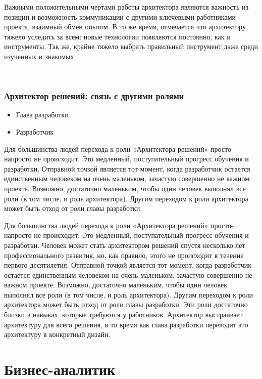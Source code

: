 \documentclass{../industrial-development}
\begin{document}
\lecturenotes

Важными положительными чертами работы архитектора являются важность из позиции и возможность коммуникации с другими ключевыми работниками проекта, взаимный обмен опытом. В то же время, отмечается что архитектору тяжело уследить за всем: новые технологии появляются постоянно, как и инструменты. Так же, крайне тяжело выбрать правильный инструмент даже среди изученных и знакомых. 

  ~\cite{Anatomy}

\begin{frame} \frametitle{Архитектор решений: связь с другими ролями}
  \begin{itemize}
  \item Глава разработки
  \item Разработчик
  \end{itemize}
	\begin{block}{}
	\alert {}Для большинства людей перехода к роли «Архитектора решений» просто-напросто не происходит. Это медленный, поступательный прогресс обучения и разработки.
	Отправной точкой является тот момент, когда разработчик остается единственным человеком на очень маленьком, зачастую совершенно не важном проекте. Возможно, достаточно маленьким, чтобы один человек выполнял все роли (в том числе, и роль архитектора). 
	Другим переходом к роли архитектора может быть отход от роли главы разработки.
\end{block}
\end{frame}

\lecturenotes
Для большинства людей перехода к роли «Архитектора решений» просто-напросто не происходит. Это медленный, поступательный прогресс обучения и разработки. Человек может стать архитектором решений спустя несколько лет профессионального развития, но, как правило, этого не происходит в течение первого десятилетия. 
Отправной точкой является тот момент, когда разработчик остается единственным человеком на очень маленьком, зачастую совершенно не важном проекте. Возможно, достаточно маленьким, чтобы один человек выполнял все роли (в том числе, и роль архитектора). 
Другим переходом к роли архитектора может быть отход от роли главы разработки. Эти роли достаточно близки в навыках, которые требуются у работников. Архитектор выстраивает архитектуру для всего решения, в то время как глава разработки переводит это архитектуру в конкретный дизайн. 

\section{Бизнес-аналитик }
\end{document}
